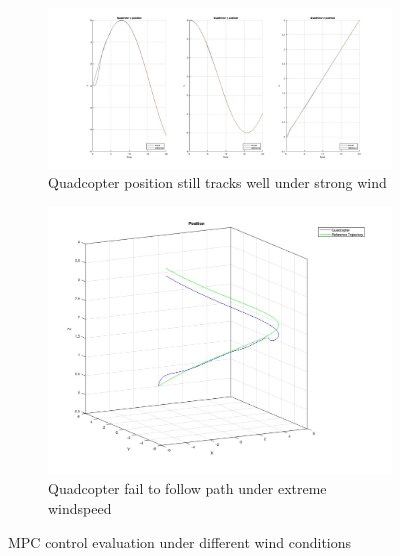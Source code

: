 \documentclass[12pt]{article}
\begin{document}
\begin{figure}[H]
    \centering
    \begin{subfigure}{.6\linewidth}
        \centering
        \includegraphics[width=\linewidth]{figures/mpc_evaluation_complex_path_strong_wind}
        \caption{Quadcopter position still tracks well under strong wind}
        \label{fig:mpc_evaluation_complex_path_strong_wind}
    \end{subfigure}
    \hspace{0.02\linewidth}
    \begin{subfigure}{.35\linewidth}
        \centering
        \includegraphics[width=\linewidth]{figures/mpc_complex_path_extreme_wind}
        \caption{Quadcopter fail to follow path under extreme windspeed}
        \label{fig:mpc_complex_path_extreme_wind}
    \end{subfigure}
    \caption{MPC control evaluation under different wind conditions}
\end{figure}
\end{document}

